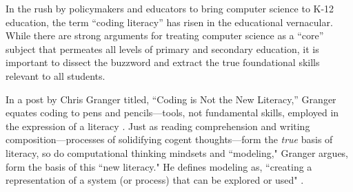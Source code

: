 In the rush by policymakers and educators to bring computer science to K-12 education, the term ``coding literacy'' has risen in the educational vernacular. While there are strong arguments for treating computer science as a ``core'' subject that permeates all levels of primary and secondary education, it is important to dissect the buzzword and extract the true foundational skills relevant to all students. \par
In a post by Chris Granger titled, ``Coding is Not the New Literacy,'' Granger equates coding to pens and pencils---tools, not fundamental skills, employed in the expression of a literacy \cite{newlit}. Just as reading comprehension and writing composition---processes of solidifying cogent thoughts---form the \textit{true} basis of literacy, so do computational thinking mindsets and ``modeling," Granger argues, form the basis of this ``new literacy." He defines modeling as, ``creating a representation of a system (or process) that can be explored or used" \cite{newlit}. \par 


